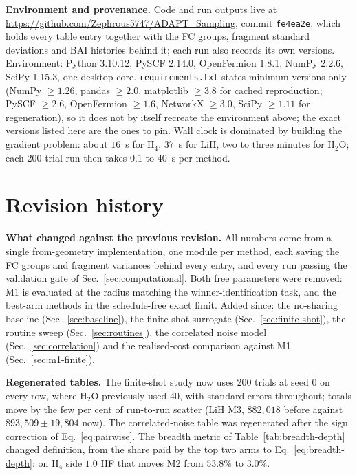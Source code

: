 \documentclass[10pt]{article}
\begin{document}
\textbf{Environment and provenance.} Code and run outputs live at
\url{https://github.com/Zephrous5747/ADAPT_Sampling}, commit \texttt{fe4ea2e},
which holds every table entry together with the FC groups, fragment standard
deviations and BAI histories behind it; each run also records its own versions.
Environment: Python 3.10.12, PySCF 2.14.0, OpenFermion 1.8.1, NumPy 2.2.6, SciPy
1.15.3, one desktop core. \texttt{requirements.txt} states minimum versions only (NumPy $\ge1.26$, pandas
$\ge2.0$, matplotlib $\ge3.8$ for cached reproduction; PySCF $\ge2.6$,
OpenFermion $\ge1.6$, NetworkX $\ge3.0$, SciPy $\ge1.11$ for regeneration), so it
does not by itself recreate the environment above; the exact versions listed here
are the ones to pin. Wall clock is dominated by
building the gradient problem: about $16$~s for H$_4$, $37$~s for LiH, two to
three minutes for H$_2$O; each 200-trial run then takes $0.1$ to $40$~s per
method.

\appendix

\section{Revision history}
\label{app:revision}

\textbf{What changed against the previous revision.} All numbers come from a
single from-geometry implementation, one module per method, each saving the FC
groups and fragment variances behind every entry, and every run passing the
validation gate of Sec.~\ref{sec:computational}. Both free parameters were removed:
M1 is evaluated at the radius matching the winner-identification task, and the
best-arm methods in the schedule-free exact limit. Added since: the no-sharing
baseline (Sec.~\ref{sec:baseline}), the finite-shot surrogate
(Sec.~\ref{sec:finite-shot}), the routine sweep (Sec.~\ref{sec:routines}), the
correlated noise model (Sec.~\ref{sec:correlation}) and the realised-cost
comparison against M1 (Sec.~\ref{sec:m1-finite}).

\textbf{Regenerated tables.} The finite-shot study now uses 200 trials at seed
$0$ on every row, where H$_2$O previously used 40, with standard errors
throughout; totals move by the few per cent of run-to-run scatter (LiH M3,
$882{,}018$ before against $893{,}509\pm19{,}804$ now). The correlated-noise
table was regenerated after the sign correction of Eq.~\eqref{eq:pairwise}. The
breadth metric of Table~\ref{tab:breadth-depth} changed definition, from the share
paid by the top two arms to Eq.~\eqref{eq:breadth-depth}: on H$_4$ side $1.0$ HF
that moves M2 from $53.8\%$ to $3.0\%$.
\end{document}
